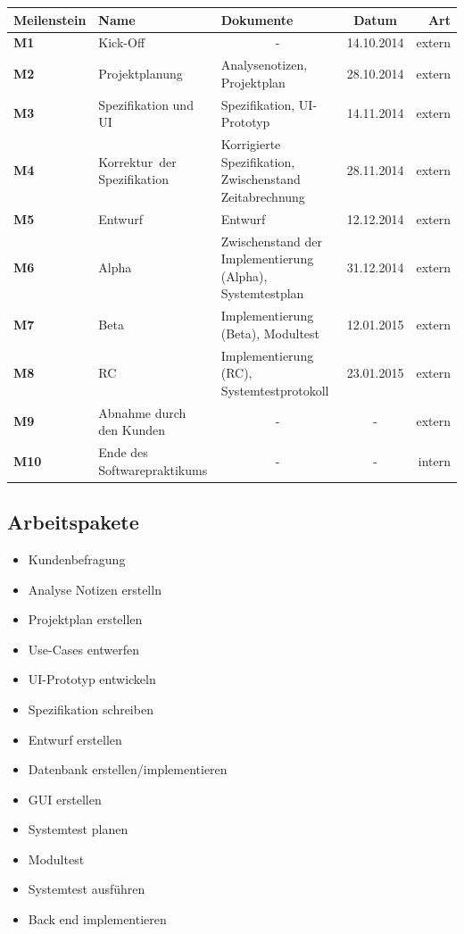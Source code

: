 \documentclass[11pt]{article}
\begin{document}
\begin{tabular}{|l|p{3.5cm}|p{3.5cm}|c|r|}
	\hline
	Meilenstein & Name & Dokumente & Datum & Art \\
	\hline \hline
	\textbf{M1} & Kick-Off & \multicolumn{1}{|c|}{-} & 14.10.2014 & extern \\
	\hline
	\textbf{M2} & Projektplanung & Analysenotizen, Projektplan & 28.10.2014 & extern \\
	\hline
	\textbf{M3} & Spezifikation und UI & Spezifikation, \mbox{UI-Prototyp} & 14.11.2014 & extern \\
	\hline
	\textbf{M4} & \mbox{Korrektur der} Spezifikation & Korrigierte Spezifikation, Zwischenstand Zeitabrechnung & 28.11.2014 & extern \\
	\hline
	\textbf{M5} & Entwurf & Entwurf & 12.12.2014 & extern \\
	\hline
	\textbf{M6} & Alpha & Zwischenstand der Implementierung (Alpha), Systemtestplan & 31.12.2014 & extern \\
	\hline
	\textbf{M7} & Beta & Implementierung (Beta), Modultest & 12.01.2015 & extern \\
	\hline
	\textbf{M8} & RC & Implementierung (RC), Systemtestprotokoll & 23.01.2015 & extern \\
	\hline
	\textbf{M9} & Abnahme durch den Kunden & \multicolumn{1}{|c|}{-} & - & extern \\
	\hline
	\textbf{M10} & Ende des Softwarepraktikums & \multicolumn{1}{|c|}{-} & - & intern \\
	\hline
\end{tabular}

\subsection{Arbeitspakete}
\begin{itemize}
\item Kundenbefragung
\item Analyse Notizen erstelln
\item Projektplan erstellen
\item Use-Cases entwerfen
\item UI-Prototyp entwickeln
\item Spezifikation schreiben
\item Entwurf erstellen
\item Datenbank erstellen/implementieren
\item GUI erstellen
\item Systemtest planen
\item Modultest
\item Systemtest ausführen
\item Back end implementieren
\end{itemize}
\end{document}
